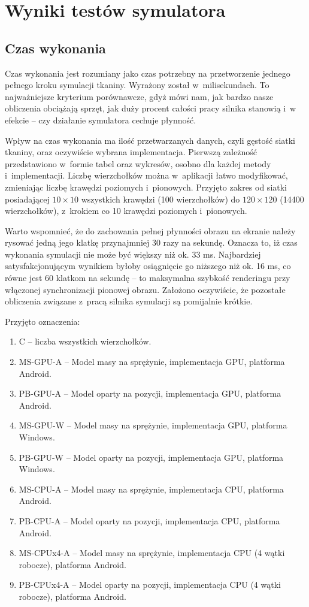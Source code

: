 \chapter{Wyniki testów symulatora}
\label{t:wyniki}

	\section{Czas wykonania}
	\label{t:wyniki:czas_wykonania}

		Czas wykonania jest rozumiany jako czas potrzebny na przetworzenie jednego pełnego kroku symulacji tkaniny. Wyrażony został w~milisekundach. To najważniejsze kryterium porównawcze, gdyż mówi nam, jak bardzo nasze obliczenia obciążają sprzęt, jak duży procent całości pracy silnika stanowią i~w efekcie -- czy działanie symulatora cechuje płynność. 
		
		Wpływ na czas wykonania ma ilość przetwarzanych danych, czyli gęstość siatki tkaniny, oraz oczywiście wybrana implementacja. Pierwszą zależność przedstawiono w~formie tabel oraz wykresów, osobno dla każdej metody i~implementacji. Liczbę wierzchołków można w~aplikacji łatwo modyfikować, zmieniając liczbę krawędzi poziomych i~pionowych. Przyjęto zakres od siatki posiadającej \(10 \times 10 \) wszystkich krawędzi (100 wierzchołków) do \( 120 \times 120 \) (14400 wierzchołków), z~krokiem co 10 krawędzi poziomych i~pionowych.
		
		Warto wspomnieć, że do zachowania pełnej płynności obrazu na ekranie należy rysować jedną jego klatkę przynajmniej 30 razy na sekundę. Oznacza to, iż czas wykonania symulacji nie może być większy niż ok. 33 ms. Najbardziej satysfakcjonującym wynikiem byłoby osiągnięcie go niższego niż ok. 16 ms, co równe jest 60 klatkom na sekundę -- to maksymalna szybkość renderingu przy włączonej synchronizacji pionowej obrazu. Założono oczywiście, że pozostałe obliczenia związane z~pracą silnika symulacji są pomijalnie krótkie.
		
		Przyjęto oznaczenia:
		
		\begin{enumerate}
			\item C -- liczba wszystkich wierzchołków.
			\item MS-GPU-A -- Model masy na sprężynie, implementacja GPU, platforma Android.
			\item PB-GPU-A -- Model oparty na pozycji, implementacja GPU, platforma Android.
			\item MS-GPU-W -- Model masy na sprężynie, implementacja GPU, platforma Windows.
			\item PB-GPU-W -- Model oparty na pozycji, implementacja GPU, platforma Windows.
			\item MS-CPU-A -- Model masy na sprężynie, implementacja CPU, platforma Android.
			\item PB-CPU-A -- Model oparty na pozycji, implementacja CPU, platforma Android.
			\item MS-CPUx4-A -- Model masy na sprężynie, implementacja CPU (4 wątki robocze), platforma Android.
			\item PB-CPUx4-A -- Model oparty na pozycji, implementacja CPU (4 wątki robocze), platforma Android.
		\end{enumerate}
		
